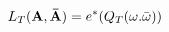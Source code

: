\begin{equation}
L_{T}({\bf A},{\bf \bar{A}})=e^{*}(Q_{T}(\omega .\bar{\omega}))
\label{eqn:LT}
\end{equation}

